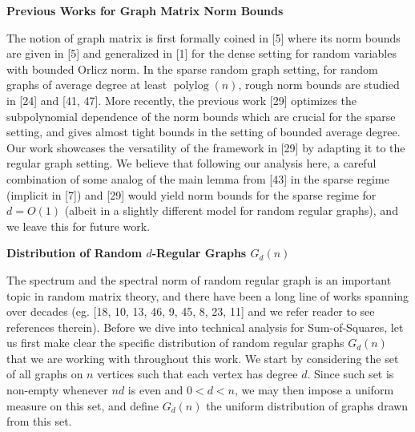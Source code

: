 \documentclass[10pt,a4paper]{article}
\begin{document}
\par\medskip\noindent\textbf{Previous Works for Graph Matrix Norm Bounds}\par




The notion of graph matrix is first formally coined in [5] where its norm bounds are given in [5] and generalized in [1] for the dense setting for random variables with bounded Orlicz norm. In the sparse random graph setting, for random graphs of average degree at least $\operatorname{polylog}(n)$, rough norm bounds are studied in [24] and [41, 47]. More recently, the previous work [29] optimizes the subpolynomial dependence of the norm bounds which are crucial for the sparse setting, and gives almost tight bounds in the setting of bounded average degree. Our work showcases the versatility of the framework in [29] by adapting it to the regular graph setting. We believe that following our analysis here, a careful
combination of some analog of the main lemma from [43] in the sparse regime (implicit in [7]) and [29] would yield norm bounds for the sparse regime for $d=O(1)$ (albeit in a slightly different model for random regular graphs), and we leave this for future work.\par





\par\medskip\noindent\textbf{Distribution of Random $d$-Regular Graphs $G_{d}(n)$
}\par




The spectrum and the spectral norm of random regular graph is an important topic in random matrix theory, and there have been a long line of works spanning over decades (eg. [18, 10, 13, 46, 9, 45, 8, 23, 11] and we refer reader to see references therein).
Before we dive into technical analysis for Sum-of-Squares, let us first make clear the specific distribution of random regular graphs $G_{d}(n)$ that we are working with throughout this work. We start by considering the set of all graphs on $n$ vertices such that each vertex has degree $d$. Since such set is non-empty whenever $nd$ is even and $0<d<n$, we may then impose a uniform measure on this set, and define $G_{d}(n)$ the uniform distribution of graphs drawn from this set.\par
\end{document}
